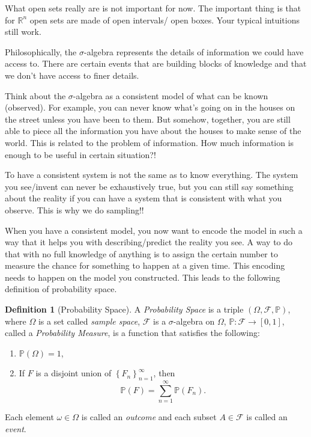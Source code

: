 \documentclass[
  openany]{book}
\theoremstyle{definition}
\newtheorem{definition}{Definition}[chapter]
\theoremstyle{definition}
\theoremstyle{definition}
\theoremstyle{definition}
\theoremstyle{remark}
\begin{document}
What open sets really are is not important for now. The important thing is that for \(\mathbb{R}^n\)
open sets are made of open intervals/ open boxes.
Your typical intuitions still work.

Philosophically, the \(\sigma\)-algebra represents the details of information we could have access to.
There are certain events that are building blocks of knowledge and that we don't have
access to finer details.

Think about the \(\sigma\)-algebra as a consistent model of what can be known (observed). For example, you can never know
what's going on in the houses on the street unless you have been to them.
But somehow, together, you are still able to piece all the information you have about the houses
to make sense of the world. This is related to the problem of information. How much information is enough to be useful in certain situation?!

To have a consistent system is not the same as to know everything. The system
you see/invent can never be exhaustively true, but you can still say something about
the reality if you can have a system that is consistent with what you observe. This
is why we do sampling!!

When you have a consistent model, you now want to encode the model in such a way
that it helps you with describing/predict the reality you see.
A way to do that with no full knowledge of anything is to assign the certain number
to measure the chance for something to happen at a given time.
This encoding needs to happen on the model you constructed. This leads to the following definition of
probability space.

\begin{definition}[Probability Space]
A \emph{Probability Space} is a triple \((\Omega, \mathcal{F}, \mathbb{P})\), where
\(\Omega\) is a set called \emph{sample space}, \(\mathcal{F}\) is a \(\sigma\)-algebra on \(\Omega\),
\(\mathbb{P}: \mathcal{F}\to [0,1]\), called a \emph{Probability Measure}, is a function that satisfies the following:

\begin{enumerate}
\def\labelenumi{\arabic{enumi}.}
\item
  \(\mathbb{P}(\Omega) =1\),
\item
  If \(F\) is a disjoint union of \(\left\{ F_n \right\}_{n=1}^\infty\), then
  \[ \mathbb{P}(F) = \sum_{n=1}^\infty \mathbb{P}(F_n) . \]
\end{enumerate}

Each element \(\omega \in \Omega\) is called an \emph{outcome} and each subset \(A \in \mathcal{F}\)
is called an \emph{event}.
\end{definition}
\end{document}
